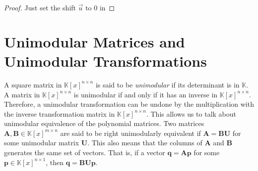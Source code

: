 \begin{proof}
Just set the shift $\vec{u}$ to 0 in 
\end{proof}
\begin{comment}
\begin{lem}
\label{lem:productDegreeBoundWithRowDegrees}If the $\vec{u}$-row
degrees of $\mathbf{A}\in\mathbb{K}\left[x\right]^{m\times n}$ are
bounded by the corresponding entries of an integer list $\vec{v}\in\mathbb{Z}^{n}$,
and the $-\vec{u}$-column degrees of $\mathbf{B}\in\mathbb{K}\left[x\right]^{n\times k}$
are bounded by $\vec{w}\in\mathbb{Z}^{k}$, then the $-\vec{v}$-column
degrees of $\mathbf{A}\mathbf{B}$ are bounded by $\vec{w}$. \end{lem}
\begin{proof}
Note that $x^{-\vec{v}}\mathbf{A}x^{\vec{u}}$ and $x^{-\vec{u}}\mathbf{B}^{-\vec{w}}$
have degrees bounded by 0. Therefore, $x^{-\vec{v}}\mathbf{A}x^{\vec{u}}x^{-\vec{u}}\mathbf{B}^{-\vec{w}}=x^{-\vec{v}}\mathbf{A}\mathbf{B}^{-\vec{w}}$
also has degree bounded by 0, or equivalently, $\cdeg_{-\vec{v}}\mathbf{A}\mathbf{B}\le\vec{w}$.
Alternatively, this also follows from the fact $\cdeg_{-\vec{v}}\mathbf{A}\le-\vec{u}$
from \prettyref{lem:productDegreeBound}.\end{proof}
\end{comment}



\section{Unimodular Matrices and Unimodular Transformations}

A square matrix in $\mathbb{K}\left[x\right]^{n\times n}$ is said
to be \emph{unimodular} if its determinant is in $\mathbb{K}$. A
matrix in $\mathbb{K}\left[x\right]^{n\times n}$ is unimodular if
and only if it has an inverse in $\mathbb{K}\left[x\right]^{n\times n}$.
Therefore, a unimodular transformation can be undone by the multiplication
with the inverse transformation matrix in $\mathbb{K}\left[x\right]^{n\times n}$.
This allows us to talk about unimodular equivalence of the polynomial
matrices. Two matrices $\mathbf{A},\mathbf{B}\in\mathbb{K}\left[x\right]^{m\times n}$
are said to be right unimodularly equivalent if $\mathbf{A}=\mathbf{B}\mathbf{U}$
for some unimodular matrix $\mathbf{U}$. This also means that the
columns of $\mathbf{A}$ and $\mathbf{B}$ generates the same set
of vectors. That is, if a vector $\mathbf{q}=\mathbf{A}\mathbf{p}$
for some $\mathbf{p}\in\mathbb{K}\left[x\right]^{n\times1}$, then
$\mathbf{q}=\mathbf{B}\mathbf{U}\mathbf{p}$.


